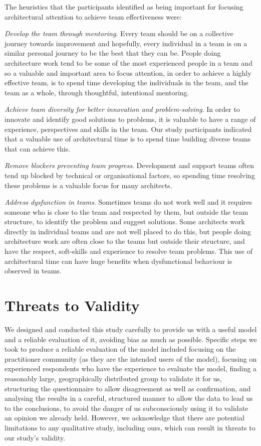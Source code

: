 The heuristics that the participants identified as being important for focusing architectural attention to achieve team effectiveness were:
\begin{description}
	\item \emph{Develop the team through mentoring}.  Every team should be on a collective journey towards improvement and hopefully, every individual in a team is on a similar personal journey to be the best that they can be.  People doing architecture work tend to be some of the most experienced people in a team and so a valuable and important area to focus attention, in order to achieve a highly effective team, is to spend time developing the individuals in the team, and the team as a whole, through thoughtful, intentional mentoring.
	\item \emph{Achieve team diversity for better innovation and problem-solving}.  In order to innovate and identify good solutions to problems, it is valuable to have a range of experience, perspectives and skills in the team.  Our study participants indicated that a valuable use of architectural time is to spend time building diverse teams that can achieve this.
	\item \emph{Remove blockers preventing team progress}.  Development and support teams often tend up blocked by technical or organisational factors, so spending time resolving these problems is a valuable focus for many architects.
	\item \emph{Address dysfunction in teams}.  Sometimes teams do not work well and it requires someone who is close to the team and respected by them, but outside the team structure, to identify the problem and suggest solutions.  Some architects work directly in individual teams and are not well placed to do this, but people doing architecture work are often close to the teams but outside their structure, and have the respect, soft-skills and experience to resolve team problems.  This use of architectural time can have huge benefits when dysfunctional behaviour is observed in teams.
\end{description}

\section{Threats to Validity}
\label{sec:threats}

We designed and conducted this study carefully to provide us with a useful model and a reliable evaluation of it, avoiding bias as much as possible.  Specific steps we took to produce a reliable evaluation of the model included focusing on the practitioner community (as they are the intended users of the model), focusing on experienced respondents who have the experience to evaluate the model, finding a reasonably large, geographically distributed group to validate it for us, structuring the questionnaire to allow disagreement as well as confirmation, and analysing the results in a careful, structured manner to allow the data to lead us to the conclusions, to avoid the danger of us subconsciously using it to validate an opinion we already held.  However, we acknowledge that there are potential limitations to any qualitative study, including ours, which can result in threats to our study's validity.

